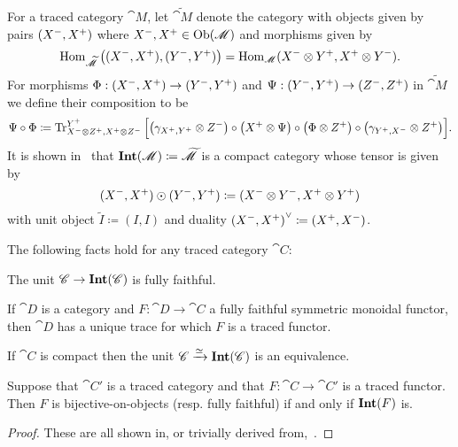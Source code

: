 \documentclass[12pt,oneside,article,draft]{memoir}
\begin{document}
For a traced category $\cat{M}$, let $\widetilde{\cat{M}}$ denote the category with
objects given by pairs $(X^-,X^+)$ where $X^-,X^+\in \operatorname{Ob}(\mathscr{M})$ and morphisms
given by
\[
   \operatorname{Hom}_{\widetilde{\mathscr{M}}}\big((X^-,X^+),(Y^-,Y^+)\big)=\operatorname{Hom}_{\mathscr{M}}(X^-\otimes Y^+,X^+\otimes Y^-).
\]
For morphisms $\Phi:(X^-,X^+)\to(Y^-,Y^+)$ and $\Psi:(Y^-,Y^+)\to(Z^-,Z^+)$ in $\widetilde{\cat{M}}$ we define their composition to be
\[
   \Psi\circ\Phi\coloneqq\operatorname{Tr}^{Y^+}_{X^-\otimes Z^+,X^+\otimes Z^-}\Big[\big(\gamma_{X^+,Y^+}\otimes Z^-\big)\circ\big(X^+\otimes\Psi\big)\circ\big(\Phi\otimes Z^+\big)\circ\big(\gamma_{Y^+,X^-}\otimes Z^+\big)\Big].
\]
It is shown in~\cite{JoyalStreetVerity} that $\mathbf{Int}(\mathscr{M})\coloneqq\widetilde{\mathscr{M}}$ is a compact category whose tensor is given by
\[
   (X^-,X^+)\odot(Y^-,Y^+)\coloneqq(X^-\otimes Y^-,X^+\otimes Y^+)
\]
with unit object $\tilde I\coloneqq(I,I)$ and duality ${(X^-,X^+)}^\vee\coloneqq(X^+,X^-)$.


%
%
%

\begin{lemma}\label{lemma:fully_faithful_and_trace}
The following facts hold for any traced category $\cat{C}$:
\begin{compactenum}[\quad i.]
   \item The unit $\mathscr{C}\to\mathbf{Int}(\mathscr{C})$ is fully faithful.
   \item If $\cat{D}$ is a category and $F\colon\cat{D}\to\cat{C}$ a fully faithful symmetric
      monoidal functor, then $\cat{D}$ has a unique trace for which $F$ is a traced functor.
   \item If $\cat{C}$ is compact then the unit $\mathscr{C}\xrightarrow{\simeq}\mathbf{Int}(\mathscr{C})$ is an equivalence.
   \item Suppose that $\cat{C'}$ is a traced category and that $F\colon \cat{C}\to \cat{C}'$ is a
      traced functor. Then $F$ is bijective-on-objects (resp. fully faithful) if and only if
      $\mathbf{Int}(F)$ is.
\end{compactenum}
\end{lemma}
\begin{proof}
   These are all shown in, or trivially derived from,~\cite{JoyalStreetVerity}.
\end{proof}
\end{document}
